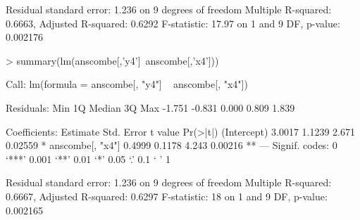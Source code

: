 \begin{Schunk}
\begin{Soutput}
Residual standard error: 1.236 on 9 degrees of freedom
Multiple R-squared: 0.6663,	Adjusted R-squared: 0.6292 
F-statistic: 17.97 on 1 and 9 DF,  p-value: 0.002176 
\end{Soutput}
\begin{Sinput}
> summary(lm(anscombe[,'y4']~anscombe[,'x4']))
\end{Sinput}
\begin{Soutput}
Call:
lm(formula = anscombe[, "y4"] ~ anscombe[, "x4"])

Residuals:
   Min     1Q Median     3Q    Max 
-1.751 -0.831  0.000  0.809  1.839 

Coefficients:
                 Estimate Std. Error t value Pr(>|t|)   
(Intercept)        3.0017     1.1239   2.671  0.02559 * 
anscombe[, "x4"]   0.4999     0.1178   4.243  0.00216 **
---
Signif. codes:  0 ‘***’ 0.001 ‘**’ 0.01 ‘*’ 0.05 ‘.’ 0.1 ‘ ’ 1 

Residual standard error: 1.236 on 9 degrees of freedom
Multiple R-squared: 0.6667,	Adjusted R-squared: 0.6297 
F-statistic:    18 on 1 and 9 DF,  p-value: 0.002165 
\end{Soutput}
\end{Schunk}
